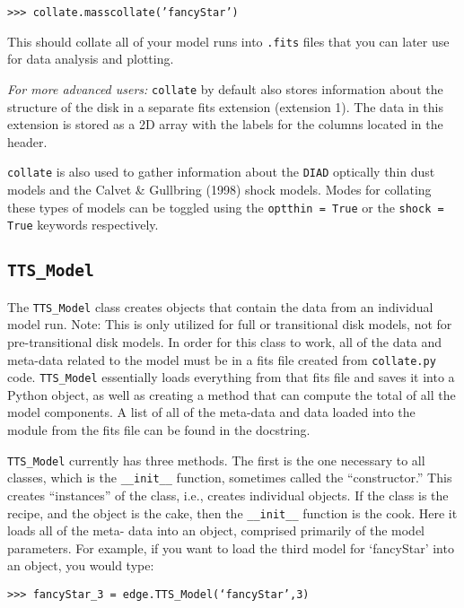 \documentclass{article}
\begin{document}
\texttt{>>> collate.masscollate('fancyStar')}
\vspace{2mm}

\noindent This should collate all of your model runs into \texttt{.fits} files that you can later use for data analysis and plotting. 

\textit{For more advanced users:} \texttt{collate} by default also stores information about the structure of the disk in a separate fits extension (extension 1). The data in this extension is stored as a 2D array with the labels for the columns located in the header. 

\texttt{collate} is also used to gather information about the \texttt{DIAD} optically thin dust models and the Calvet \& Gullbring (1998) shock models. Modes for collating these types of models can be toggled using the \texttt{optthin = True} or the \texttt{shock = True} keywords respectively.

 
\subsection {\texttt{TTS\_Model}}

The \texttt{TTS\_Model} class creates objects that contain the data from an individual model run. Note: This is only utilized for full or transitional disk models, not for pre-transitional disk models. In order for this class to work, all of the data and meta-data related to the model must be in a fits file created from \texttt{collate.py} code. \texttt{TTS\_Model} essentially loads everything from that fits file and saves it into a Python object, as well as creating a method that can compute the total of all the model components. A list of all of the meta-data and data loaded into the module from the fits file can be found in the docstring. 
 
\texttt{TTS\_Model} currently has three methods. The first is the one necessary to all classes, which is the \texttt{\_\_init\_\_} function, sometimes called the “constructor.” This creates “instances” of the class, i.e., creates individual objects. If the class is the recipe, and the object is the cake, then the \texttt{\_\_init\_\_} function is the cook. Here it loads all of the meta- data into an object, comprised primarily of the model parameters. For example, if you want to load the third model for `fancyStar' into an object, you would type: 
 
\vspace{2mm}
\texttt{>>> fancyStar\_3 = edge.TTS\_Model(‘fancyStar’,3)}
\vspace{2mm}
\end{document}
